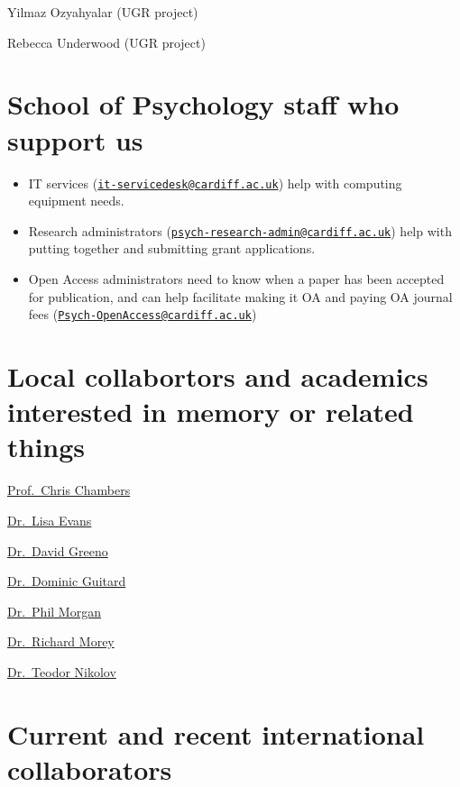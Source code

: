 \documentclass[
  12pt,
]{book}
\begin{document}
Yilmaz Ozyahyalar (UGR project)

Rebecca Underwood (UGR project)

\section{School of Psychology staff who support us}\label{school-of-psychology-staff-who-support-us}

\begin{itemize}
\item
  IT services (\href{mailto:it-servicedesk@cardiff.ac.uk}{\nolinkurl{it-servicedesk@cardiff.ac.uk}}) help with computing equipment needs.
\item
  Research administrators (\href{mailto:psych-research-admin@cardiff.ac.uk}{\nolinkurl{psych-research-admin@cardiff.ac.uk}}) help with putting together and submitting grant applications.
\item
  Open Access administrators need to know when a paper has been accepted for publication, and can help facilitate making it OA and paying OA journal fees (\href{mailto:Psych-OpenAccess@cardiff.ac.uk}{\nolinkurl{Psych-OpenAccess@cardiff.ac.uk}})
\end{itemize}

\section{Local collabortors and academics interested in memory or related things}\label{local-collabortors-and-academics-interested-in-memory-or-related-things}

\href{https://www.cardiff.ac.uk/people/view/133632-chambers-chris}{Prof.~Chris Chambers}

\href{http://psych.cf.ac.uk/contactsandpeople/evanslh.php}{Dr.~Lisa Evans}

\href{https://www.cardiff.ac.uk/people/view/2470753-}{Dr.~David Greeno}

\href{https://www.cardiff.ac.uk/people/view/2670796-}{Dr.~Dominic Guitard}

\href{http://psych.cf.ac.uk/contactsandpeople/morganphil.php}{Dr.~Phil Morgan}

\href{http://psych.cf.ac.uk/contactsandpeople/moreyr.php}{Dr.~Richard Morey}

\href{https://profiles.cardiff.ac.uk/staff/nikolovty}{Dr.~Teodor Nikolov}

\section{Current and recent international collaborators}\label{current-and-recent-international-collaborators}
\end{document}
